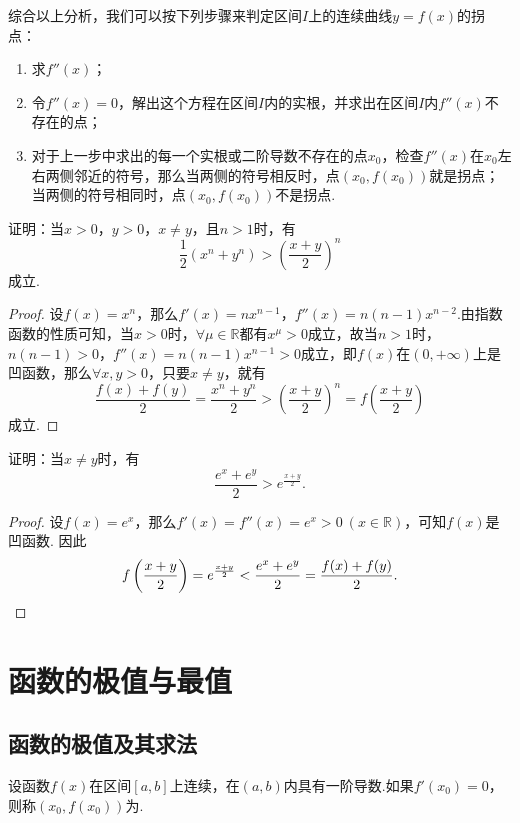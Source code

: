 {\color{red}综合以上分析，我们可以按下列步骤来判定区间\(I\)上的连续曲线\(y=f(x)\)的拐点：\begin{enumerate}
\item 求\(f''(x)\)；
\item 令\(f''(x) = 0\)，解出这个方程在区间\(I\)内的实根，并求出在区间\(I\)内\(f''(x)\)不存在的点；
\item 对于上一步中求出的每一个实根或二阶导数不存在的点\(x_0\)，检查\(f''(x)\)在\(x_0\)左右两侧邻近的符号，那么当两侧的符号相反时，点\((x_0,f(x_0))\)就是拐点；
当两侧的符号相同时，点\((x_0,f(x_0))\)不是拐点.
\end{enumerate}}

\begin{example}
证明：当\(x>0\)，\(y>0\)，\(x \neq y\)，且\(n>1\)时，有\begin{equation}\label{equation:微分中值定理.平均数的比较1}
\frac{1}{2} (x^n+y^n) > \left(\frac{x+y}{2}\right)^n
\end{equation}成立.
\begin{proof}
设\(f(x) = x^n\)，那么\(f'(x) = n x^{n-1}\)，\(f''(x) = n(n-1) x^{n-2}\).由指数函数的性质可知，当\(x > 0\)时，\(\forall \mu \in \mathbb{R}\)都有\(x^{\mu} > 0\)成立，故当\(n > 1\)时，\(n(n-1)>0\)，\(f''(x) = n(n-1) x^{n-1} > 0\)成立，即\(f(x)\)在\((0,+\infty)\)上是凹函数，那么\(\forall x,y>0\)，只要\(x \neq y\)，就有\[
\frac{f(x)+f(y)}{2} = \frac{x^n+y^n}{2} > \left(\frac{x+y}{2}\right)^n = f\left(\frac{x+y}{2}\right)
\]成立.
\end{proof}
\end{example}

\begin{example}
证明：当\(x \neq y\)时，有\begin{equation}
\frac{e^x + e^y}{2} > e^{\frac{x+y}{2}}.
\end{equation}
\begin{proof}
设\(f(x) = e^x\)，那么\(f'(x) = f''(x) = e^x > 0\ (x\in\mathbb{R})\)，可知\(f(x)\)是凹函数.
因此\[
f\left(\frac{x+y}{2}\right) = e^{\frac{x+y}{2}}
< \frac{e^x+e^y}{2} = \frac{f(x)+f(y)}{2}.
\qedhere
\]
\end{proof}
\end{example}

\section{函数的极值与最值}
\subsection{函数的极值及其求法}
\begin{definition}[驻点]
设函数\(f(x)\)在区间\([a,b]\)上连续，在\((a,b)\)内具有一阶导数.如果\(f'(x_0)=0\)，则称\((x_0,f(x_0))\)为.
\end{definition}

